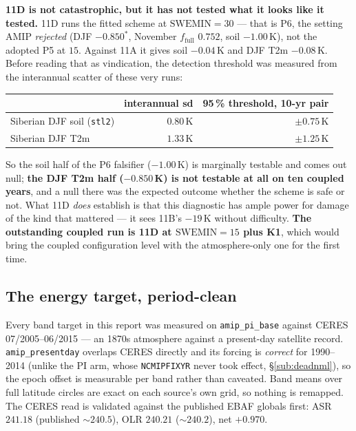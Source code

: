 \documentclass[10pt]{article}
\begin{document}
\textbf{11D is not catastrophic, but it has not tested what it looks like it tested.}
11D runs the fitted scheme at $\mathrm{SWEMIN}=30$ --- that is P6, the setting AMIP
\emph{rejected} (DJF $-0.850^*$, November $f_{\text{full}}$ $0.752$, soil $-1.00$\,K),
not the adopted P5 at $15$. Against 11A it gives soil $-0.04$\,K and DJF T2m $-0.08$\,K.
Before reading that as vindication, the detection threshold was measured from the
interannual scatter of these very runs:

\begin{center}\footnotesize
\begin{tabular}{l r r}
\toprule
 & interannual sd & 95\,\% threshold, 10-yr pair \\
\midrule
Siberian DJF soil (\texttt{stl2}) & $0.80$\,K & $\pm0.75$\,K \\
Siberian DJF T2m & $1.33$\,K & $\pm1.25$\,K \\
\bottomrule
\end{tabular}
\end{center}

\noindent So the soil half of the P6 falsifier ($-1.00$\,K) is marginally testable and
comes out null; \textbf{the DJF T2m half ($-0.850$\,K) is not testable at all on ten
coupled years}, and a null there was the expected outcome whether the scheme is safe or
not. What 11D \emph{does} establish is that this diagnostic has ample power for damage of
the kind that mattered --- it sees 11B's $-19$\,K without difficulty. \textbf{The
outstanding coupled run is 11D at $\mathrm{SWEMIN}=15$ plus K1}, which would bring the
coupled configuration level with the atmosphere-only one for the first time.

\subsection{The energy target, period-clean}\label{sub:periodclean}
Every band target in this report was measured on \texttt{amip\_pi\_base} against CERES
07/2005--06/2015 --- an 1870s atmosphere against a present-day satellite record.
\texttt{amip\_presentday} overlaps CERES directly and its forcing is \emph{correct} for
1990--2014 (unlike the PI arm, whose \texttt{NCMIPFIXYR} never took effect,
\S\ref{sub:deadnml}), so the epoch offset is measurable per band rather than
caveated. Band means over full latitude circles are exact on each source's own grid, so
nothing is remapped. The CERES read is validated against the published EBAF globals
first: ASR $241.18$ (published ${\sim}240.5$), OLR $240.21$ (${\sim}240.2$), net $+0.970$.
\end{document}
